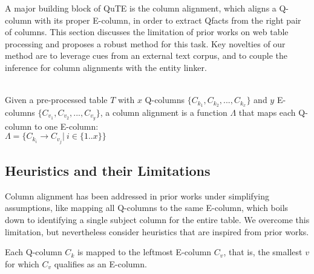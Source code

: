 A major building block of QuTE is the column alignment, which aligns a Q-column with its proper E-column, in order to extract Qfacts from the right pair of columns. This section discusses the limitation of prior works on web table processing and proposes a robust method for this task.
Key novelties of our method are to leverage cues from an external text corpus, and to couple the inference for column alignments with the entity linker.

\vspace{0.1cm}
\\
Given a pre-processed table ${T}$ with $x$ Q-columns $\{{C}_{k_1},{C}_{k_2},..., {C}_{k_x}\}$ and $y$ E-columns $\{{C}_{v_1},{C}_{v_2},..., {C}_{v_y} \}$, a column alignment is a function $\Lambda$ that maps each Q-column to one E-column:\\
$\Lambda = \big\{{C}_{k_i} \rightarrow {C}_{v_j}|~i \in \{1..x\}\big\}$

\subsection{Heuristics and their Limitations}
\label{subsec:CA-priorworks}

Column alignment has been addressed in prior works 
\cite{DBLP:journals/pvldb/VenetisHMPSWMW11,DBLP:journals/pvldb/DengJLLY13,DBLP:conf/er/BraunschweigTL15}
 under simplifying assumptions, like
mapping all Q-columns to the same E-column,
which boils down to identifying a single
subject column for the entire table.
We overcome this limitation, but nevertheless
consider heuristics that are inspired from prior works.


\vspace{0.1cm}
Each Q-column $C_k$ is mapped to the leftmost
E-column $C_v$, that is, the smallest $v$
for which $C_v$ qualifies as an E-column.

